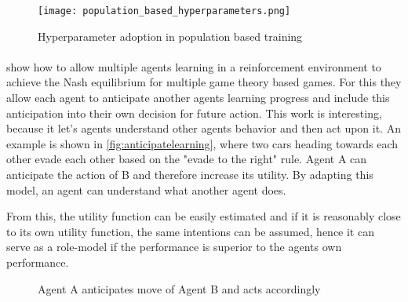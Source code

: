 \documentclass[12pt,a4paper]{article}
\begin{document}
\begin{figure}[]
    \centering
    \texttt{[image: population\_based\_hyperparameters.png]}
    \caption{Hyperparameter adoption in population based training \cite{jaderberg2017population}}
    \label{fig:populationtraining}
\end{figure}

\paragraph{\citeauthor{foerster2017learning}}
 show how to allow multiple agents learning in a reinforcement environment to achieve the Nash equilibrium for multiple game theory based games. For this they allow each agent to anticipate another agents learning progress and include this anticipation into their own decision for future action. This work is interesting, because it let's agents understand other agents behavior and then act upon it. An example is shown in \autoref{fig:anticipatelearning}, where  two cars heading towards each other evade each other based on the "evade to the right" rule. Agent A can anticipate the action of B and therefore increase its utility. By adapting this model, an agent can understand what another agent does.

From this, the utility function can be easily estimated and if it is reasonably close to its own utility function, the same intentions can be assumed, hence it can serve as a role-model if the performance is superior to the agents own performance.

\begin{figure}[H]
    \centering
    \caption{Agent A anticipates move of Agent B and acts accordingly}
    \label{fig:anticipatelearning}
\end{figure}
\end{document}

